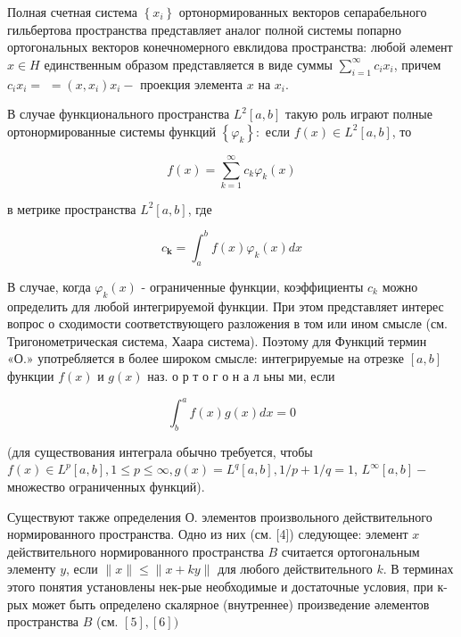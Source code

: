 \documentclass[10pt]{article}
\begin{document}
Полная счетная система $\left\{x_{i}\right\}$ ортонормированных векторов сепарабельного гильбертова пространства представляет аналог полной системы попарно ортогональных векторов конечномерного евклидова пространства: любой әлемент $x \in H$ единственным образом представляется в виде суммы $\sum_{i=1}^{\infty} c_{i} x_{i}$, причем $c_{i} x_{i}=$ $=\left(x, x_{i}\right) x_{i}-$ проекция элемента $x$ на $x_{i}$.



В случае функционального пространства $L^{2}[a, b]$ такую роль играют полные ортонормированные системы функций $\left\{\varphi_{k}\right\}:$ если $f(x) \in L^{2}[a, b]$, то



\[

f(x)=\sum_{k=1}^{\infty} c_{k} \varphi_{k}(x)

\]



в метрике пространства $L^{2}[a, b]$, где



\[

c_{\boldsymbol{k}}=\int_{a}^{b} f(x) \varphi_{k}(x) d x

\]



В случае, когда $\varphi_{k}(x)$ - ограниченные функции, коэффициенты $c_{k}$ можно определить для любой интегрируемой функции. При этом представляет интерес вопрос о сходимости соответствующего разложения в том или ином смысле (см. Тригонометрическая система, Хаара система). Поэтому для Функций термин «О.» употребляется в более широком смысле: интегрируемые на отрезке $[a, b]$ функции $f(x)$ и $g(x)$ наз. о р т о г о н а л ьны ми, если



\[

\int_{b}^{a} f(x) g(x) d x=0

\]



(для существования интеграла обычно требуется, чтобы $f(x) \in L^{p}[a, b], 1 \leqslant p \leqslant \infty, g(x)=L^{q}[a, b], 1 / p+1 / q=1$, $L^{\infty}[a, b]-$ множество ограниченных функций).



Существуют также определения О. элементов произвольного действительного нормированного пространства. Одно из них (см. [4]) следующее: элемент $x$ действительного нормированного пространства $B$ считается ортогональным элементу $y$, если $\|x\| \leqslant\|x+k y\|$ для любого действительного $k$. В терминах этого понятия установлены нек-рые необходимые и достаточные условия, при к-рых может быть определено скалярное (внутреннее) произведение әлементов пространства $B$ (см. $[5],[6])$
\end{document}
